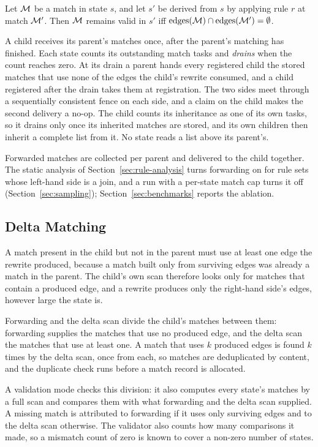 \begin{proposition}
Let $\mathcal{M}$ be a match in state $s$, and let $s'$ be derived from $s$ by applying rule $r$ at match $\mathcal{M}'$. Then $\mathcal{M}$ remains valid in $s'$ iff $\text{edges}(\mathcal{M}) \cap \text{edges}(\mathcal{M}') = \emptyset$.
\end{proposition}

A child receives its parent's matches once, after the parent's matching has finished. Each state
counts its outstanding match tasks and \emph{drains} when the count reaches zero. At its drain a
parent hands every registered child the stored matches that use none of the edges the child's
rewrite consumed, and a child registered after the drain takes them at registration. The two sides
meet through a sequentially consistent fence on each side, and a claim on the child makes the
second delivery a no-op. The child counts its inheritance as one of its own tasks, so it drains
only once its inherited matches are stored, and its own children then inherit a complete list from
it. No state reads a list above its parent's.

Forwarded matches are collected per parent and delivered to the child together. The static
analysis of Section~\ref{sec:rule-analysis} turns forwarding on for rule sets whose left-hand side
is a join, and a run with a per-state match cap turns it off (Section~\ref{sec:sampling});
Section~\ref{sec:benchmarks} reports the ablation.

\subsection{Delta Matching}
\label{sec:delta}

A match present in the child but not in the parent must use at least one edge the rewrite produced,
because a match built only from surviving edges was already a match in the parent. The child's own
scan therefore looks only for matches that contain a produced edge, and a rewrite produces only the
right-hand side's edges, however large the state is.

Forwarding and the delta scan divide the child's matches between them: forwarding supplies the
matches that use no produced edge, and the delta scan the matches that use at least one. A match
that uses $k$ produced edges is found $k$ times by the delta scan, once from each, so matches are
deduplicated by content, and the duplicate check runs before a match record is allocated.

A validation mode checks this division: it also computes every state's matches by a full scan and
compares them with what forwarding and the delta scan supplied. A missing match is attributed to
forwarding if it uses only surviving edges and to the delta scan otherwise. The validator also
counts how many comparisons it made, so a mismatch count of zero is known to cover a non-zero
number of states.
